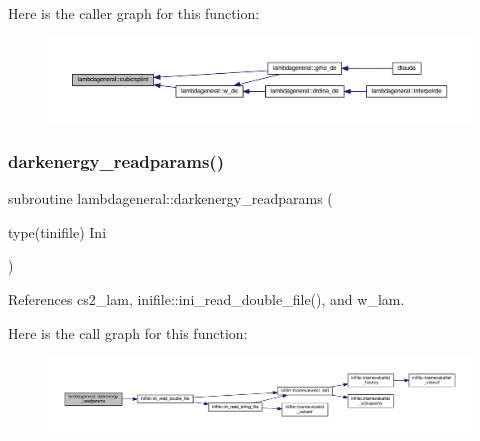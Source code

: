 Here is the caller graph for this function\+:
\nopagebreak
\begin{figure}[H]
\begin{center}
\leavevmode
\includegraphics[width=350pt]{namespacelambdageneral_ac223e519da99aef58a91fb3932b7c438_icgraph}
\end{center}
\end{figure}
\mbox{\label{namespacelambdageneral_a780328d728ca15af725d6f53b2fa54d1}} 
\subsubsection{\texorpdfstring{darkenergy\+\_\+readparams()}{darkenergy\_readparams()}}
{\footnotesize\ttfamily subroutine lambdageneral\+::darkenergy\+\_\+readparams (\begin{DoxyParamCaption}\item[{type(tinifile)}]{Ini }\end{DoxyParamCaption})}



References cs2\+\_\+lam, inifile\+::ini\+\_\+read\+\_\+double\+\_\+file(), and w\+\_\+lam.

Here is the call graph for this function\+:
\nopagebreak
\begin{figure}[H]
\begin{center}
\leavevmode
\includegraphics[width=350pt]{namespacelambdageneral_a780328d728ca15af725d6f53b2fa54d1_cgraph}
\end{center}
\end{figure}
\mbox{\label{namespacelambdageneral_a446a7b395384f258ea37364624b12206}} 
